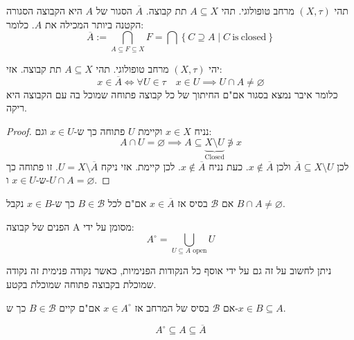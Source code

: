 \documentclass{tstextbook}
\begin{document}
\begin{definition}
תהי \((X,\tau)\) מרחב טופולוגי. תהי \(A\subseteq X\) תת קבוצה. \(\overline{A}\) הסגור של \(A\) היא הקבוצה הסגורה הקטנה ביותר המכילה את \(A\). כלומר:
$$\overline{A} := \bigcap_{A\subseteq F\subseteq X} F=\bigcap\left\{ C\supseteq A\mid C{\mathrm{~is~closed}} \right\}$$

\end{definition}
\begin{proposition}
יהי \((X,\tau)\) מרחב טופולוגי. תהי \(A\subseteq X\) תת קבוצה. אזי:
$$x\in \overline{A} \iff \forall U \in \tau \quad x \in U \implies U\cap  A\neq \varnothing $$
כלומר איבר נמצא בסגור אם"ם החיתוך של כל קבוצה פתוחה שמוכל בה עם הקבוצה היא ריקה.

\end{proposition}
\begin{proof}
נניח \(x \in X\) וקיימת \(U\) פתוחה כך ש-\(x \in U\) וגם:
$$A\cap  U = \varnothing \implies A\subseteq \underbrace{ X \setminus  U }_{ \text{Closed} } \not\ni x$$
לכן \(\overline{A} \subseteq X \setminus U\) ולכן \(x \not\in \overline{ A}\).
כעת נניח \(x \not\in \overline{A}\). לכן קיימת. אזי ניקח \(U= X \setminus \overline{A}\). זו פתוחה כך ש-\(x \in U\) ו-\(U\cap A = \varnothing\).

\end{proof}
\begin{corollary}
אם \(\mathcal{ B}\) בסיס אז \(x \in \overline{A}\) אם"ם לכל \(B \in \mathcal{B}\) כך ש-\(x \in B\) נקבל \(B\cap A \neq \varnothing\).

\end{corollary}
\begin{definition}
הפנים של קבוצה A מסומן על ידי:
$$A^{\circ }=\bigcup_{U\subseteq A \text{ open}}U$$

\end{definition}
\begin{remark}
ניתן לחשוב על זה גם על ידי אוסף כל הנקודות הפנימיות, כאשר נקודה פנימית זה נקודה שמוכלת בקבוצה פתוחה שמוכלת בקטע.

\end{remark}
\begin{proposition}
אם \(\mathcal{B}\) בסיס של המרחב אז \(x \in A^{\circ}\) אם"ם קיים \(B \in \mathcal{B}\) כך ש-\(x \in B\subseteq A\).

\end{proposition}
\begin{proposition}
$$A^{\circ }\subseteq A\subseteq \overline{A} $$

\end{proposition}
\end{document}
